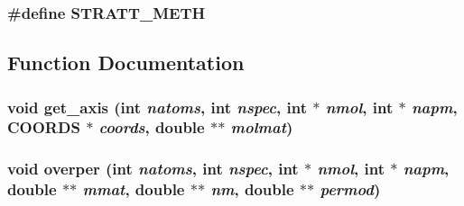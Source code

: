 \subsubsection{\setlength{\rightskip}{0pt plus 5cm}\#define STRATT\_\-METH}\label{nma__axis_8c_f2301cf66ef9cadc34507ab428844442}




\subsection{Function Documentation}
\subsubsection{\setlength{\rightskip}{0pt plus 5cm}void get\_\-axis (int {\em natoms}, int {\em nspec}, int $\ast$ {\em nmol}, int $\ast$ {\em napm}, {\bf COORDS} $\ast$ {\em coords}, double $\ast$$\ast$ {\em molmat})}\label{nma__axis_8c_7166278f8c92e42fabf71c0254b69cb1}


\subsubsection{\setlength{\rightskip}{0pt plus 5cm}void overper (int {\em natoms}, int {\em nspec}, int $\ast$ {\em nmol}, int $\ast$ {\em napm}, double $\ast$$\ast$ {\em mmat}, double $\ast$$\ast$ {\em nm}, double $\ast$$\ast$ {\em permod})}\label{nma__axis_8c_8bbe99a6111f460ec1955dbeaa99ba95}


